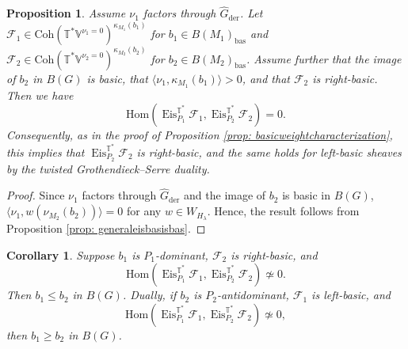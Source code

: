 \documentclass{amsart}
\newtheorem{proposition}[theorem]{Proposition}
\newtheorem{corollary}[theorem]{Corollary}
\theoremstyle{definition}
\theoremstyle{remark}
\numberwithin{equation}{section}
\newcommand{\der}{\mathrm{der}}
\newcommand{\mc}{\mathcal}
\newcommand{\bas}{\mathrm{bas}}
\newcommand{\Hom}{\mathrm{Hom}}
\newcommand{\wh}{\widehat}
\DeclareMathOperator{\Eis}{\mathrm{Eis}}
\newcommand{\Coh}{\mathrm{Coh}}
\newcommand{\V}{\mathbb{V}}
\newcommand{\T}{\mathbb{T}}
\begin{document}
\begin{proposition}{\label{prop: EisBasisBas}}
Assume $\nu_1$ factors through $\wh G_\der$. 
Let $\mc F_1 \in \Coh(\T^{\ast}\V^{\nu_1=0})^{\kappa_{M_1}(b_1)}$ for $b_1 \in B(M_1)_{\bas}$ and $\mc F_2 \in \Coh(\T^* \V^{\nu_2=0})^{\kappa_{M_2}(b_2)}$ for $b_2 \in B(M_2)_{\bas}$. Assume further that the image of $b_2$ in $B(G)$ is basic, that $\langle \nu_1,\kappa_{M_1}(b_1)\rangle > 0$, and that $\mc F_2$ is right-basic. Then we have 
\[
\Hom (\Eis^{\T^{\ast}}_{P_1} \mc F_1, \Eis^{\T^{\ast}}_{P_2} \mc F_2)=0. 
\]
Consequently, as in the proof of Proposition \ref{prop: basicweightcharacterization}, this implies that $\Eis^{\T^{\ast}}_{P_2} \mc F_2$ is right-basic, and the same holds for left-basic sheaves by the twisted Grothendieck--Serre duality. 
\end{proposition}

\begin{proof}
Since $\nu_1$ factors through $\wh G_\der$ and the image of $b_2$ is basic in $B(G)$, $\langle \nu_1,w(\nu_{M_2}(b_2))\rangle=0$ for any $w\in W_{H_\lambda}$. Hence, the result follows from Proposition \ref{prop: generaleisbasisbas}.
\end{proof}

\begin{corollary}{\label{cor: eisHomnonvanishingconditions}}
Suppose $b_1$ is $P_1$-dominant, $\mc F_2$ is right-basic, and
\[
\Hom (\Eis^{\T^{\ast}}_{P_1} \mc F_1, \Eis^{\T^{\ast}}_{P_2} \mc F_2)\not\simeq 0.
\]
Then $b_1 \leq b_2$ in $B(G)$. Dually, if $b_{2}$ is $P_2$-antidominant, $\mc F_1$ is left-basic, and 
\[
\Hom (\Eis^{\T^{\ast}}_{P_1} \mc F_1, \Eis^{\T^{\ast}}_{P_2} \mc F_2)\not\simeq 0, 
\]
then $b_1\geq b_2$ in $B(G)$. 
\end{corollary}
\end{document}
